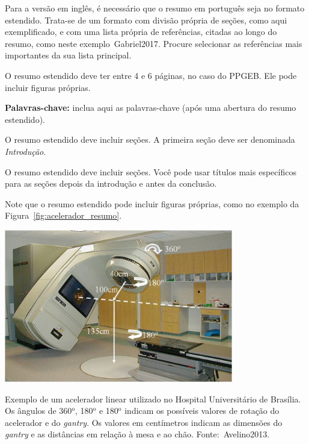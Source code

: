 \documentclass[a4paper, 12pt]{ppgeb}
\begin{document}
Para a versão em inglês, é necessário que o resumo em português seja no formato estendido. Trata-se de um formato com divisão própria de seções, como aqui exemplificado, e com uma lista própria de referências, citadas ao longo do resumo, como neste exemplo~\cite{resumoestendido}{Gabriel2017}. Procure selecionar as referências mais importantes da sua lista principal.

O resumo estendido deve ter entre 4 e 6 páginas, no caso do PPGEB. Ele pode incluir figuras próprias.

\vspace{14pt}

\noindent\textbf{Palavras-chave: }inclua aqui as palavras-chave (após uma abertura do resumo estendido).

O resumo estendido deve incluir seções. A primeira seção deve ser denominada \emph{Introdução}.

O resumo estendido deve incluir seções. Você pode usar títulos mais específicos para as seções depois da introdução e antes da conclusão.

Note que o resumo estendido pode incluir figuras próprias, como no exemplo da Figura~\ref{fig:acelerador_resumo}.

\begin{figureresumo}
\centering
\vspace*{18pt}
\includegraphics[width=100mm]{Acelerador2}
\caption{Exemplo de um acelerador linear utilizado no Hospital Universitário de Brasília. Os ângulos de 360${^{\textrm{o}} }$, 180${^{\textrm{o}} }$ e 180${^{\textrm{o}} }$ indicam os possíveis valores de rotação do acelerador e do \emph{gantry}. Os valores em centímetros indicam as dimensões do \emph{gantry} e as distâncias em relação à mesa e ao chão. Fonte:~\cite{resumoestendido}{Avelino2013}.}\label{fig:acelerador_resumo}
\end{figureresumo}
\end{document}
